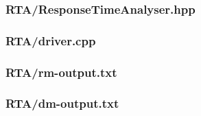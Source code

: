 \documentclass{article}
\numberwithin{equation}{section}
\numberwithin{table}{section}
\numberwithin{figure}{section}
\begin{document}
\clearpage\subsubsection{RTA/ResponseTimeAnalyser.hpp}


\clearpage\subsubsection{RTA/driver.cpp}


\clearpage\subsubsection{RTA/rm-output.txt}


\clearpage\subsubsection{RTA/dm-output.txt}

\end{document}
